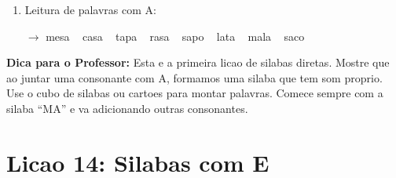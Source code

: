 \begin{exercicio}
\begin{enumerate}[resume]
  \item Leitura de palavras com A:
  \begin{center}
  $\rightarrow$ mesa  ~  casa  ~  tapa  ~  rasa  ~  sapo  ~  lata  ~  mala  ~  saco
  \end{center}
\end{enumerate}
\end{exercicio}

\begin{dica}
\textbf{Dica para o Professor:} Esta e a primeira licao de silabas diretas. Mostre que ao juntar uma consonante com A, formamos uma silaba que tem som proprio. Use o cubo de silabas ou cartoes para montar palavras. Comece sempre com a silaba ``MA'' e va adicionando outras consonantes.
\end{dica}

\section{Licao 14: Silabas com E}

\rotinasimples
{}



